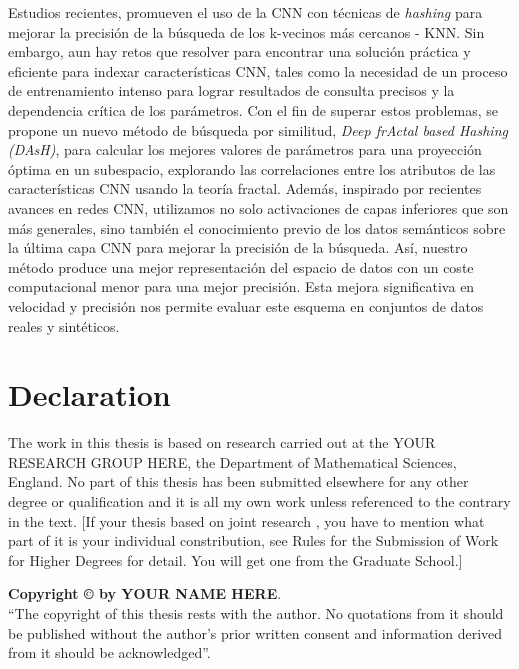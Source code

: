 Estudios recientes, promueven el uso de la \acf{CNN} con técnicas de  \textit{hashing} para mejorar la precisión de la búsqueda de los k-vecinos más cercanos - KNN.  Sin embargo, aun hay retos que resolver para encontrar una solución práctica y eficiente para indexar características  CNN, tales como la necesidad de un proceso de entrenamiento intenso para lograr resultados de consulta precisos y la dependencia crítica de los parámetros.   Con el fin de superar estos problemas, se propone un nuevo método de búsqueda por similitud, \textit{Deep frActal based  Hashing (DAsH)}, para calcular los mejores valores de parámetros  para una proyección óptima en un subespacio, explorando las correlaciones entre los atributos de las características  CNN usando la teoría fractal. Además, inspirado por recientes avances  en redes CNN, utilizamos no solo activaciones de capas inferiores que son más generales, sino también el conocimiento previo de los datos semánticos sobre la última capa CNN para mejorar la precisión de la búsqueda.  Así, nuestro método produce una mejor representación del espacio de datos con un coste computacional menor para una mejor precisión. Esta mejora  significativa en velocidad y precisión nos permite evaluar este esquema en conjuntos de datos reales y sintéticos.


\chapter*{Declaration}
The work in this thesis is based on research carried out at the
YOUR RESEARCH GROUP HERE, the Department of Mathematical Sciences, England. No part of this thesis has been submitted elsewhere for any other degree or qualification and it is all
my own work unless referenced to the contrary in the text. [If your thesis based on joint research , you have to mention what part of it is your individual constribution, see Rules for the Submission of Work for Higher Degrees for detail. You will get one from the Graduate School.]



\vspace{2in}
\noindent \textbf{Copyright \copyright{} by YOUR NAME HERE}.\\
``The copyright of this thesis rests with the author.  No quotations
from it should be published without the author's prior written consent
and information derived from it should be acknowledged''.



